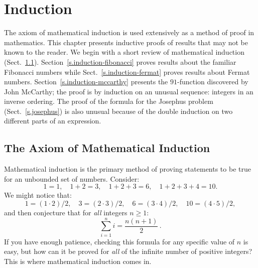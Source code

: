 
\chapter{Induction}\label{c.induction}




The axiom of mathematical induction is used extensively as a method of proof in mathematics. This chapter presents inductive proofs of results that may not be known to the reader. We begin with a short review of mathematical induction (Sect.~\ref{s.induction-axiom}). Section~\ref{s.induction-fibonacci} proves results about the familiar Fibonacci numbers while Sect.~\ref{s.induction-fermat} proves results about Fermat numbers. Section~\ref{s.induction-mccarthy} presents the $91$-function discovered by John McCarthy; the proof is by induction on an unusual sequence: integers in an inverse ordering. The proof of the formula for the Josephus problem (Sect.~\ref{s.josephus}) is also unusual because of the double induction on two different parts of an expression.

\section{The Axiom of Mathematical Induction}\label{s.induction-axiom}

Mathematical induction is the primary method of proving statements to be true for an unbounded set of numbers. Consider:
\[
1=1,\quad 1+2=3,\quad 1+2+3=6,\quad 1+2+3+4=10.
\]
We might notice that:
\[
1=(1\cdot 2)/2,\quad 3=(2\cdot 3)/2,\quad  6=(3\cdot 4)/2,\quad 10=(4\cdot 5)/2,
\]
and then conjecture that for \emph{all} integers $n\geq 1$:
\[
\sum_{i=1}^n i = \frac{n(n+1)}{2}\,.
\]
If you have enough patience, checking this formula for any specific value of $n$ is easy, but how can it be proved for \emph{all} of the infinite number of positive integers? This is where mathematical induction comes in.

